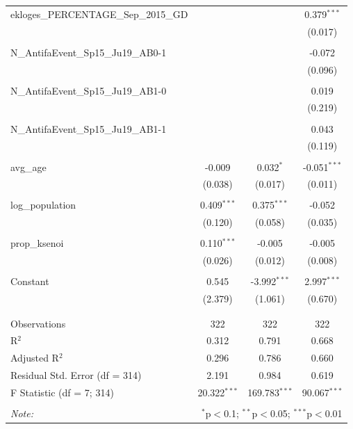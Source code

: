 \documentclass[12pt,letterpaper]{article}
\begin{document}
\begin{table}[!htbp]
\begin{tabular}{@{\extracolsep{5pt}}lccc}
		ekloges\_PERCENTAGE\_Sep\_2015\_GD &  &  & 0.379$^{***}$ \\ 
		&  &  & (0.017) \\ 
		& & & \\ 
		N\_AntifaEvent\_Sp15\_Ju19\_AB0-1 &  &  & -0.072 \\ 
		&  &  & (0.096) \\ 
		& & & \\ 
		N\_AntifaEvent\_Sp15\_Ju19\_AB1-0 &  &  & 0.019 \\ 
		&  &  & (0.219) \\ 
		& & & \\ 
		N\_AntifaEvent\_Sp15\_Ju19\_AB1-1 &  &  & 0.043 \\ 
		&  &  & (0.119) \\ 
		& & & \\ 
		avg\_age & -0.009 & 0.032$^{*}$ & -0.051$^{***}$ \\ 
		& (0.038) & (0.017) & (0.011) \\ 
		& & & \\ 
		log\_population & 0.409$^{***}$ & 0.375$^{***}$ & -0.052 \\ 
		& (0.120) & (0.058) & (0.035) \\ 
		& & & \\ 
		prop\_ksenoi & 0.110$^{***}$ & -0.005 & -0.005 \\ 
		& (0.026) & (0.012) & (0.008) \\ 
		& & & \\ 
		Constant & 0.545 & -3.992$^{***}$ & 2.997$^{***}$ \\ 
		& (2.379) & (1.061) & (0.670) \\ 
		& & & \\ 
		\hline \\[-1.8ex] 
		Observations & \multicolumn{1}{c}{322} & \multicolumn{1}{c}{322} & \multicolumn{1}{c}{322} \\ 
		R$^{2}$ & \multicolumn{1}{c}{0.312} & \multicolumn{1}{c}{0.791} & \multicolumn{1}{c}{0.668} \\ 
		Adjusted R$^{2}$ & \multicolumn{1}{c}{0.296} & \multicolumn{1}{c}{0.786} & \multicolumn{1}{c}{0.660} \\ 
		Residual Std. Error (df = 314) & \multicolumn{1}{c}{2.191} & \multicolumn{1}{c}{0.984} & \multicolumn{1}{c}{0.619} \\ 
		F Statistic (df = 7; 314) & \multicolumn{1}{c}{20.322$^{***}$} & \multicolumn{1}{c}{169.783$^{***}$} & \multicolumn{1}{c}{90.067$^{***}$} \\ 
		\hline 
		\hline \\[-1.8ex] 
		\textit{Note:}  & \multicolumn{3}{r}{$^{*}$p$<$0.1; $^{**}$p$<$0.05; $^{***}$p$<$0.01} \\ 
	\end{tabular} 
\end{table}
\end{document}
